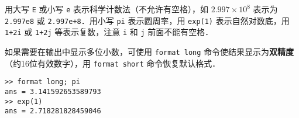 用大写 \verb|E| 或小写 \verb|e| 表示科学计数法（不允许有空格），如 $2.997\times 10^8$ 表示为 \verb|2.997e8| 或 \verb|2.997e+8|．用小写 \verb|pi| 表示圆周率，用 \verb|exp(1)| 表示自然对数底，用 \verb|1+2i| 或 \verb|1+2j| 等表示复数，注意 \verb|i| 和 \verb|j| 前面不能有空格．

如果需要在输出中显示多位小数，可使用 \verb|format long| 命令使结果显示为\textbf{双精度}（约16位有效数字），用 \verb|format short| 命令恢复默认格式．
\begin{lstlisting}[language=matlabC]
>> format long; pi
ans = 3.141592653589793
>> exp(1)
ans = 2.718281828459046
\end{lstlisting}
